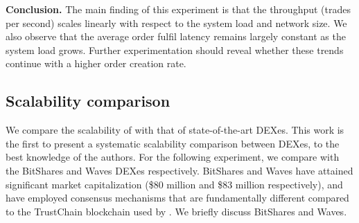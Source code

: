 
\textbf{Conclusion.}
The main finding of this experiment is that the throughput (trades per second) scales linearly with respect to the system load and network size.
We also observe that the average order fulfil latency remains largely constant as the system load grows.
Further experimentation should reveal whether these trends continue with a higher order creation rate.

\subsection{Scalability comparison}
\label{sec:experiment_comparison}
We compare the scalability of \ModelName{} with that of state-of-the-art DEXes.
This work is the first to present a systematic scalability comparison between DEXes, to the best knowledge of the authors.
For the following experiment, we compare \ModelName{} with the BitShares and Waves DEXes respectively.
BitShares and Waves have attained significant market capitalization (\$80 million and \$83 million respectively), and have employed consensus mechanisms that are fundamentally different compared to the TrustChain blockchain used by \ModelName{}.
We briefly discuss BitShares and Waves.

